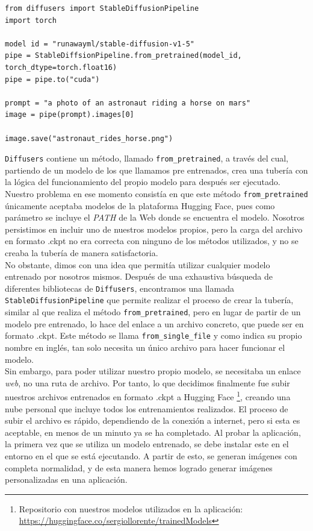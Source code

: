 \begin{lstlisting}
from diffusers import StableDiffusionPipeline
import torch

model id = "runawayml/stable-diffusion-v1-5"
pipe = StableDiffsionPipeline.from_pretrained(model_id,
torch_dtype=torch.float16)
pipe = pipe.to("cuda")
	
prompt = "a photo of an astronaut riding a horse on mars"
image = pipe(prompt).images[0]
	
image.save("astronaut_rides_horse.png")
\end{lstlisting}




\texttt{Diffusers} contiene un método, llamado \texttt{from\_pretrained}, a través del cual, partiendo de un modelo de los que llamamos pre entrenados, crea una tubería con la lógica del funcionamiento del propio modelo para después ser ejecutado. Nuestro problema  en ese momento consistía en que este método \texttt{from\_pretrained} únicamente aceptaba modelos de la plataforma Hugging Face, pues como parámetro se incluye el \textit{PATH} de la Web donde se encuentra el modelo. Nosotros persistimos en incluir uno de nuestros modelos propios, pero la carga del archivo en formato .ckpt no era correcta con ninguno de los métodos utilizados, y no se creaba la tubería de manera satisfactoria. \\

No obstante, dimos con una idea que permitía utilizar cualquier modelo entrenado por nosotros mismos. Después de una exhaustiva búsqueda de diferentes bibliotecas de \texttt{Diffusers}, encontramos una llamada \texttt{StableDiffusionPipeline} que permite realizar el proceso de crear la tubería, similar al que realiza el método \texttt{from\_pretrained}, pero en lugar de partir de un modelo pre entrenado, lo hace del enlace a un archivo concreto, que puede ser en formato .ckpt. Este método se llama \texttt{from\_single\_file} y como indica su propio nombre en inglés, tan solo necesita un único archivo para hacer funcionar el modelo.\\

Sin embargo, para poder utilizar nuestro propio modelo, se necesitaba un enlace \textit{web}, no una ruta de archivo. Por tanto, lo que decidimos finalmente fue subir nuestros archivos entrenados en formato .ckpt a Hugging Face \footnote{Repositorio con nuestros modelos utilizados en la aplicación: \url{https://huggingface.co/sergiollorente/trainedModels}}, creando una nube personal que incluye todos los entrenamientos realizados. El proceso de subir el archivo es rápido, dependiendo de la conexión a internet, pero si esta es aceptable, en menos de un minuto ya se ha completado. Al probar la aplicación, la primera vez que se utiliza un modelo entrenado, se debe instalar este en el entorno en el que se está ejecutando. A partir de esto, se generan imágenes con completa normalidad, y de esta manera hemos logrado generar imágenes personalizadas en una aplicación.\\

